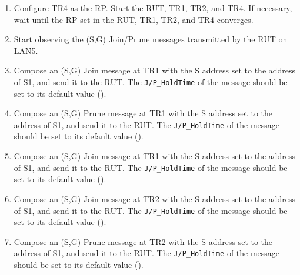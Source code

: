 \documentclass[11pt]{report}
\begin{document}


\begin{enumerate}

  \item Configure TR4 as the RP. Start the RUT, TR1, TR2, and TR4. If
  necessary, wait until the RP-set in the RUT, TR1, TR2, and TR4
  converges.

  \item Start observing the (S,G) Join/Prune messages transmitted by the
  RUT on LAN5.

  \item Compose an (S,G) Join message at TR1 with the S address set to the
  address of S1, and send it to the RUT. 
  The \verb=J/P_HoldTime= of the message should be set to its default
  value ({\PimsmJPHoldTime}).

  \item Compose an (S,G) Prune message at TR1 with the S address set to the
  address of S1, and send it to the RUT. 
  The \verb=J/P_HoldTime= of the message should be set to its default
  value ({\PimsmJPHoldTime}).

  \item Compose an (S,G) Join message at TR1 with the S address set to the
  address of S1, and send it to the RUT. 
  The \verb=J/P_HoldTime= of the message should be set to its default
  value ({\PimsmJPHoldTime}).

  \item Compose an (S,G) Join message at TR2 with the S address set to the
  address of S1, and send it to the RUT. 
  The \verb=J/P_HoldTime= of the message should be set to its default
  value ({\PimsmJPHoldTime}).

  \item Compose an (S,G) Prune message at TR2 with the S address set to the
  address of S1, and send it to the RUT. 
  The \verb=J/P_HoldTime= of the message should be set to its default
  value ({\PimsmJPHoldTime}).

\end{enumerate}

\end{document}

